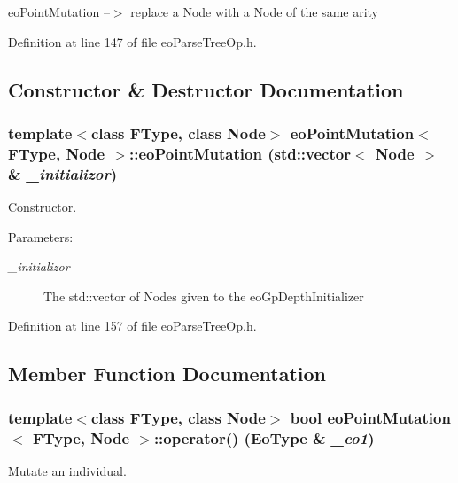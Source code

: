 eo\-Point\-Mutation --$>$ replace a Node with a Node of the same arity 



Definition at line 147 of file eo\-Parse\-Tree\-Op.h.

\subsection{Constructor \& Destructor Documentation}
\subsubsection{\setlength{\rightskip}{0pt plus 5cm}template$<$class FType, class Node$>$ {\bf eo\-Point\-Mutation}$<$ FType, Node $>$::{\bf eo\-Point\-Mutation} (std::vector$<$ Node $>$ \& {\em \_\-initializor})\hspace{0.3cm}{\tt  [inline]}}\label{classeo_point_mutation_a0}


Constructor. 

\begin{Desc}
\item[Parameters:]
\begin{description}
\item[{\em \_\-initializor}]The std::vector of Nodes given to the eo\-Gp\-Depth\-Initializer \end{description}
\end{Desc}


Definition at line 157 of file eo\-Parse\-Tree\-Op.h.

\subsection{Member Function Documentation}
\subsubsection{\setlength{\rightskip}{0pt plus 5cm}template$<$class FType, class Node$>$ bool {\bf eo\-Point\-Mutation}$<$ FType, Node $>$::operator() ({\bf Eo\-Type} \& {\em \_\-eo1})\hspace{0.3cm}{\tt  [inline]}}\label{classeo_point_mutation_a3}


Mutate an individual. 

